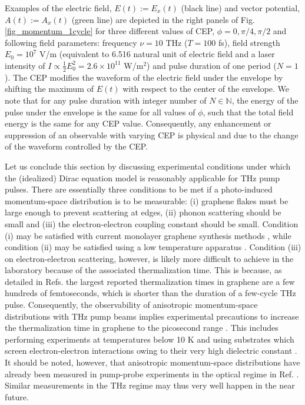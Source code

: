 \documentclass[9pt,twocolumn,twoside]{osajnl}
\begin{document}
Examples of the electric field, $E(t):= E_{x}(t)$ (black line) and vector potential, $A(t):=A_{x}(t)$ (green line) are depicted in the right panels of Fig. \ref{fig_momentum_1cycle}   for three different values of CEP, $\phi=0, \pi/4, \pi/2$ and following  field parameters: frequency $\nu=10$ THz ($T=100$ fs),   field strength $E_0=10^7$ V/m (equivalent to 6.516  natural unit of electric field and a laser intensity of $I \propto  \frac{1}{2}E_0^2 = 2.6\times 10^{11}$ W/m$^2$) and  pulse duration of one period ($N=1$). The CEP modifies the waveform of the electric field under the envelope by shifting the maximum of $E(t)$ with respect to the center of the envelope. 
We note that for any pulse duration with integer number of $N \in \mathbb{N}$, the energy of the pulse under the envelope is the same for all values of $\phi$, such that  the total field energy is the same for any CEP value. Consequently, any enhancement or suppression of an observable with varying CEP is physical and due to the change of the waveform controlled by the CEP. 

Let us conclude this section by discussing experimental conditions under which the (idealized) Dirac equation model is reasonably applicable for THz pump pulses.
There are essentially three conditions to be met if a photo-induced momentum-space distribution is to be measurable: (i) graphene flakes must be large enough to prevent scattering at edges, (ii) phonon scattering should be small and (iii) the electron-electron coupling constant should be small.
Condition (i) may be satisfied with current monolayer graphene synthesis methods \cite{RevModPhys.86.959}, while condition (ii) may be satisfied using a low temperature apparatus \cite{PhysRevLett.99.086804}.
Condition (iii) on electron-electron scattering, however, is likely more difficult to achieve in the laboratory because of the associated thermalization time.
This is because, as detailed in Refs. \cite{ANDP:ANDP201700038, Oladyshkin2017} the largest reported thermalization times in graphene are a few hundreds of femtoseconds, which is shorter than the duration of a few-cycle THz pulse.
Consequently, the observability of anisotropic momentum-space distributions with THz pump beams implies experimental precautions to increase the thermalization time in graphene to the picosecond range \cite{PhysRevB.94.125423, arXiv:1710.09889}.
This includes performing experiments at temperatures below 10 K \cite{PhysRevB.90.245423} and using substrates which screen electron-electron interactions owing to their very high dielectric constant \cite{PhysRevLett.107.225501}.
It should be noted, however, that anisotropic momentum-space distributions have already been measured in pump-probe experiments in the optical regime in Ref. \cite{PhysRevB.96.020301}.
Similar measurements in the THz regime may thus very well happen in the near future.
\end{document}
